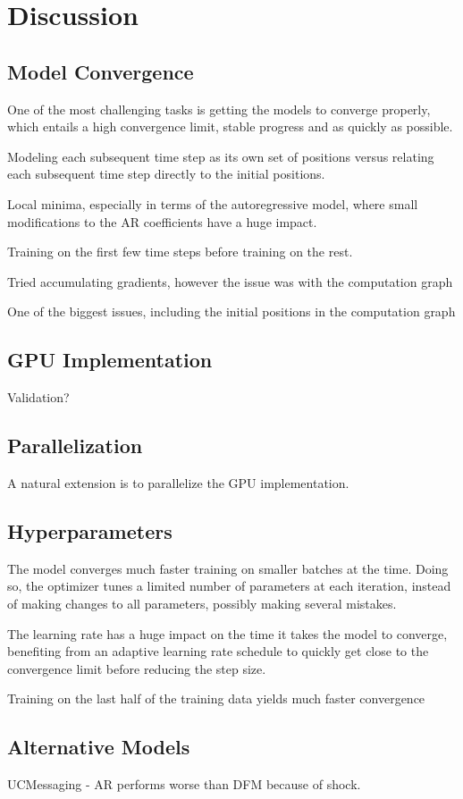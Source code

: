 \chapter{Discussion}\label{ch:Discussion}

\section{Model Convergence}

One of the most challenging tasks is getting the models to converge properly, which entails a high convergence limit, stable progress and as quickly as possible.

Modeling each subsequent time step as its own set of positions versus relating each subsequent time step directly to the initial positions.

Local minima, especially in terms of the autoregressive model, where small modifications to the AR coefficients have a huge impact.


Training on the first few time steps before training on the rest.


Tried accumulating gradients, however the issue was with the computation graph

One of the biggest issues, including the initial positions in the computation graph

\section{GPU Implementation}

    Validation?

\section{Parallelization}

    A natural extension is to parallelize the GPU implementation.

\section{Hyperparameters}

The model converges much faster training on smaller batches at the time. Doing so, the optimizer tunes a limited number of parameters at each iteration, instead of making changes to all parameters, possibly making several mistakes.

The learning rate has a huge impact on the time it takes the model to converge, benefiting from an adaptive learning rate schedule to quickly get close to the convergence limit before reducing the step size.



Training on the last half of the training data yields much faster convergence

\section{Alternative Models}

UCMessaging - AR performs worse than DFM because of shock.